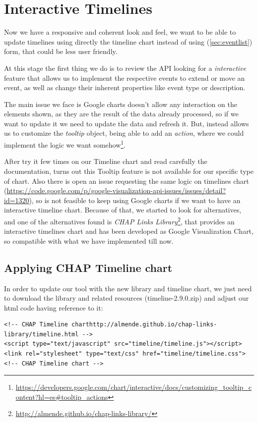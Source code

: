 \chapter{Interactive Timelines}
Now we have a responsive and coherent look and feel, we want to be able to
update timelines using directly the timeline chart instead of using 
(\ref{sec:eventlist}) form, that could be less user friendly.

At this stage the first thing we do is to review the API looking for a
\emph{interactive} feature that allows us to implement the respective events to
extend or move an event, as well as change their inherent properties like event
type or description.

The main issue we face is Google charts doesn't allow any interaction on the
elements shown, as they are the result of the data already processed, so if we
want to update it we need to update the data and refresh it. But, instead allows
us to customize the \emph{tooltip} object, being able to add an \emph{action},
where we could implement the logic we want
somehow\footnote{\url{https://developers.google.com/chart/interactive/docs/customizing_tooltip_content?hl=es#tooltip_actions}}.

After try it few times on our Timeline chart and read carefully the
documentation, turns out this Tooltip feature is not available for our specific
type of chart. Also there is open an issue requesting the same logic on
timelines chart
(\url{https://code.google.com/p/google-visualization-api-issues/issues/detail?id=1320}),
so is not feasible to keep using Google charts if we want to have an interactive
timeline chart. Because of that, we started to look for alternatives, and one of
the alternatives found is \emph{CHAP Links
Library}\footnote{\url{http://almende.github.io/chap-links-library/}}, that
provides an interactive timelines chart and has been developed as Google
Visualization Chart, so compatible with what we have implemented till now.

\section{Applying CHAP Timeline chart}
In order to update our tool with the new library and timeline chart, we just
need to download the library and related resources (timeline-2.9.0.zip) and
adjust our html code having reference to it:

\begin{lstlisting}[style=html,breaklines=true,caption=CHAP\ Link\
library,label=f_interactivetimelines_code]
<!-- CHAP Timeline charthttp://almende.github.io/chap-links-library/timeline.html -->
<script type="text/javascript" src="timeline/timeline.js"></script> 
<link rel="stylesheet" type="text/css" href="timeline/timeline.css">
<!-- CHAP Timeline chart -->
\end{lstlisting} 

